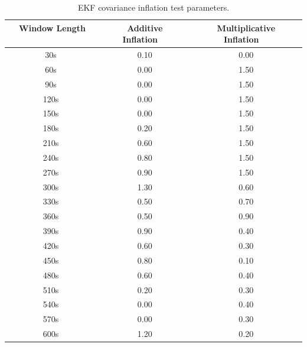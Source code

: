 \begin{table}[h!]
\caption[EKF covariance inflation test parameters]{EKF covariance inflation test parameters.}
\begin{center}
\begin{tabular}{ccc}
\hline
{\bf Window Length ~~~~} & {\bf Additive Inflation~~} & {\bf Multiplicative Inflation~~}\\
\hline
\hline
~30s ~& 0.10 & 0.00 \\ \hline
~60s ~& 0.00 & 1.50 \\ \hline
~90s ~& 0.00 & 1.50 \\ \hline
~120s ~& 0.00 & 1.50 \\ \hline
~150s ~& 0.00 & 1.50 \\ \hline
~180s ~& 0.20 & 1.50 \\ \hline
~210s ~& 0.60 & 1.50 \\ \hline
~240s ~& 0.80 & 1.50 \\ \hline
~270s ~& 0.90 & 1.50 \\ \hline
~300s ~& 1.30 & 0.60 \\ \hline
~330s ~& 0.50 & 0.70 \\ \hline
~360s ~& 0.50 & 0.90 \\ \hline
~390s ~& 0.90 & 0.40 \\ \hline
~420s ~& 0.60 & 0.30 \\ \hline
~450s ~& 0.80 & 0.10 \\ \hline
~480s ~& 0.60 & 0.40 \\ \hline
~510s ~& 0.20 & 0.30 \\ \hline
~540s ~& 0.00 & 0.40 \\ \hline
~570s ~& 0.00 & 0.30 \\ \hline
~600s ~& 1.20 & 0.20 \\ 
\hline
\end{tabular}
\end{center}
\label{table:EKFCovInfl}
\end{table} 


